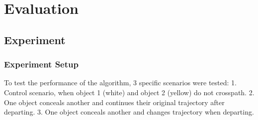 
\chapter{Evaluation}\label{sec:evalutaion}
\section{Experiment }\label{sec:3-experiment}
\subsection{Experiment Setup}\label{sec:3-setup}
To test the performance of the algorithm, 3 specific scenarios were tested:
1. Control scenario, when object 1 (white) and object 2 (yellow) do not crosspath.
2. One object conceals another and continues their original trajectory after departing.
3. One object conceals another and changes trajectory when departing.
